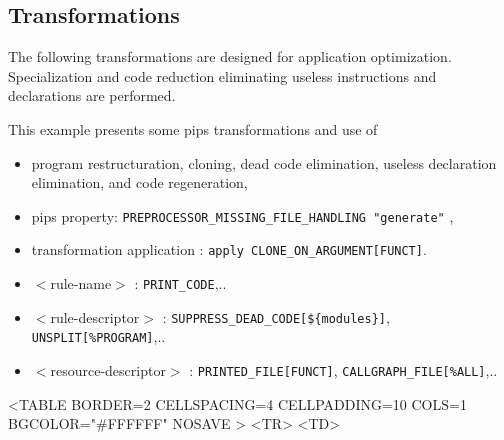 \documentclass[a4paper,12pt]{article}
\begin{document}
\subsection{Transformations}
\label{exm3}

The following transformations are designed for application optimization.
Specialization and code reduction eliminating useless instructions and
declarations are performed.

This example presents some pips transformations and use of 
\begin{itemize}
\item program restructuration, cloning, dead code elimination, useless
  declaration elimination, and code regeneration, 
\item pips property: \verb+PREPROCESSOR_MISSING_FILE_HANDLING "generate"+ , 
\item transformation application : \verb+apply CLONE_ON_ARGUMENT[FUNCT]+.
\item $<$rule-name$>$ : \verb+PRINT_CODE+,..
\item $<$rule-descriptor$>$ :  \verb+SUPPRESS_DEAD_CODE[${modules}]+,  \verb+UNSPLIT[%PROGRAM]+,..
\item $<$resource-descriptor$>$ :  \verb+PRINTED_FILE[FUNCT]+,  \verb+CALLGRAPH_FILE[%ALL]+,..
\end{itemize}
\begin{rawhtml}
<TABLE BORDER=2 CELLSPACING=4 CELLPADDING=10 COLS=1  BGCOLOR="#FFFFFF" NOSAVE >
<TR>
<TD>
\end{rawhtml}
\end{document}

